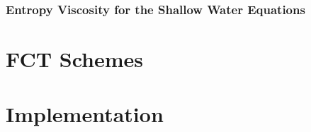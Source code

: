     \subsubsection{Entropy Viscosity for the Shallow Water Equations}
      
\section{FCT Schemes}  
\section{Implementation}  
